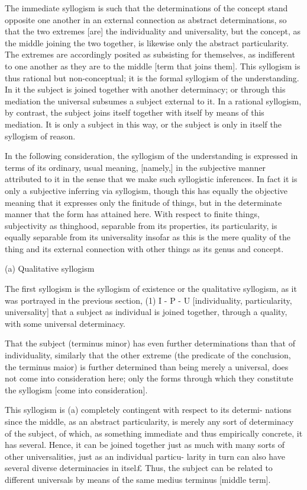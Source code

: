 The immediate syllogism is such that the determinations of the concept
stand opposite one another in an external connection as abstract determinations,
so that the two extremes [are] the individuality and universality,
but the concept, as the middle joining the two together,
is likewise only the abstract particularity.
The extremes are accordingly posited as subsisting for themselves,
as indifferent to one another as they are to the middle [term that joins them].
This syllogism is thus rational but non-conceptual;
it is the formal syllogism of the understanding.
In it the subject is joined together with another determinacy;
or through this mediation the universal subsumes a subject external to it.
In a rational syllogism, by contrast, the subject joins itself
together with itself by means of this mediation.
It is only a subject in this way, or the subject is only in itself
the syllogism of reason.

In the following consideration, the syllogism of the understanding
is expressed in terms of its ordinary, usual meaning, [namely,] in
the subjective manner attributed to it in the sense that
we make such syllogistic inferences.
In fact it is only a subjective inferring via syllogism,
though this has equally the objective meaning that
it expresses only the finitude of things,
but in the determinate manner that the form has attained here.
With respect to finite things, subjectivity as thinghood,
separable from its properties, its particularity, is
equally separable from its universality insofar as this is
the mere quality of the thing and its external connection with
other things as its genus and concept.

(a) Qualitative syllogism

The first syllogism is the syllogism of existence
or the qualitative syllogism,
as it was portrayed in the previous section,
(1) I - P - U
[individuality, particularity, universality]
that a subject as individual is joined together, through a quality,
with some universal determinacy.

That the subject (terminus minor) has even further determinations than
that of individuality, similarly that the other extreme
(the predicate of the conclusion, the terminus maior) is
further determined than being merely a universal,
does not come into consideration here;
only the forms through which they constitute the syllogism [come into consideration].

This syllogism is (a) completely contingent with respect to its determi-
nations since the middle, as an abstract particularity, is merely any sort of
determinacy of the subject, of which, as something immediate and thus
empirically concrete, it has several. Hence, it can be joined together just as
much with many sorts of other universalities, just as an individual particu-
larity in turn can also have several diverse determinacies in itsel£ Thus, the
subject can be related to different universals by means of the same medius
terminus [middle term].

